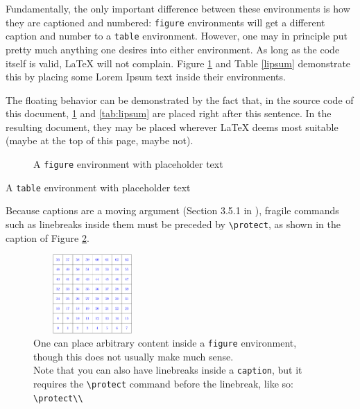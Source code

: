 \documentclass[article,a4paper,oneside,10pt]{memoir}
\newcommand\code[1]{\texttt{#1}}
\begin{document}
Fundamentally, the only important difference between these environments is how
they  are  captioned  and  numbered: \verb|figure|  environments  will  get  a
different caption and  number to a \verb|table|  environment. However, one may
in principle put pretty much  anything one desires into either environment. As
long  as  the  code  itself  is  valid,  \LaTeX{}  will  not  complain. Figure
\ref{fig:lipsum} and Table \ref{lipsum} demonstrate this by placing some Lorem
Ipsum text inside their environments.

The floating behavior can be demonstrated by the fact that, in the source code
of this document, \ref{fig:lipsum} and \ref{tab:lipsum} are placed right after
this sentence. In the resulting document, they may be placed wherever \LaTeX{}
deems most suitable (maybe at the top of this page\footnotemark, maybe not).



\begin{figure}
    \small\lipsum[2]
    \caption{A \texttt{figure} environment with placeholder text}
    \label{fig:lipsum}
\end{figure}

\begin{table}
    \caption{A \texttt{table} environment with placeholder text}
    \label{tab:lipsum}
    \small\lipsum[2]
\end{table}


Because  captions are  a moving  argument (Section  3.5.1 in  \cite{lamport}),
fragile  commands  such  as  linebreaks   inside  them  must  be  preceded  by
\verb|\protect|, as shown in the caption of Figure \ref{fig:protect}.

\begin{figure}
    \centering
    \includegraphics[height=3cm,width=4.5cm]{images/grid8cm.png}
    \caption[Linebreaks in Captions]{%
        One can  place arbitrary  content inside a  \code{figure} environment,
        though this does not usually make much sense.\protect\\
        Note      that       you      can      also       have      linebreaks
        inside     a      \code{caption},     but     it      requires     the
        \code{\textbackslash{}protect} command before  the linebreak, like so:
        \code{\textbackslash{}protect\textbackslash\textbackslash}}
    \label{fig:protect}
\end{figure}
\end{document}
